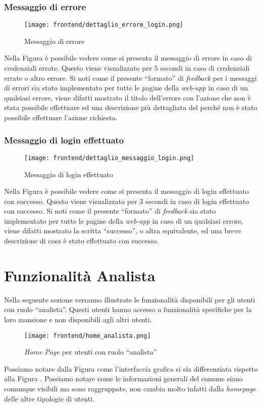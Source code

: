         \subsubsection{Messaggio di errore}
        \begin{figure}[H]
            \centering
            \texttt{[image: frontend/dettaglio\_errore\_login.png]}
            \caption{Messaggio di errore}
            \label{fig:frontend-login-error}
        \end{figure}
        Nella Figura  è possibile vedere come si presenta il messaggio di errore in caso di credenziali errate. Questo viene visualizzato per $5$ secondi in caso di credenziali errate o altro errore.\newline
        Si noti come il presente ``formato'' di \textit{feedback} per i messaggi di errori sia stato implementato per tutte le pagine della \textit{web-app} in caso di un qualsiasi errore, viene difatti mostrato il titolo dell'errore con l'azione che non è stata possibile effettuare ed una descrizione più dettagliata del perché non è stato possibile effettuare l'azione richiesta.
        \subsubsection{Messaggio di login effettuato}
        \begin{figure}[H]
            \centering
            \texttt{[image: frontend/dettaglio\_messaggio\_login.png]}
            \caption{Messaggio di login effettuato}
            \label{fig:frontend-login-success}
        \end{figure}
        Nella Figura  è possibile vedere come si presenta il messaggio di login effettuato con successo. Questo viene visualizzato per $3$ secondi in caso di login effettuato con successo.\newline
        Si noti come il presente ``formato'' di \textit{feedback} sia stato implementato per tutte le pagine della \textit{web-app} in caso di un qualsiasi errore, viene difatti mostrato la scritta ``successo'', o altra equivalente, ed una breve descrizione di cosa è stato effettuato con successo.
\section{Funzionalità Analista}
    Nella seguente sezione verranno illustrate le funzionalità disponibili per gli utenti con ruolo ``analista''. Questi utenti hanno accesso a funzionalità specifiche per la loro mansione e non disponibili agli altri utenti.
    \begin{figure}[H]
        \centering
        \texttt{[image: frontend/home\_analista.png]}
        \caption{\textit{Home Page} per utenti con ruolo ``analista''}
        \label{fig:frontend-analista}
    \end{figure}
    Possiamo notare dalla Figura  come l'interfaccia grafica si sia differenziata rispetto alla Figura . Possiamo notare come le informazioni generali del comune siano comunque visibili ma sono raggruppate, non cambia molto infatti dalla \textit{homepage} delle altre tipologie di utenti. 
